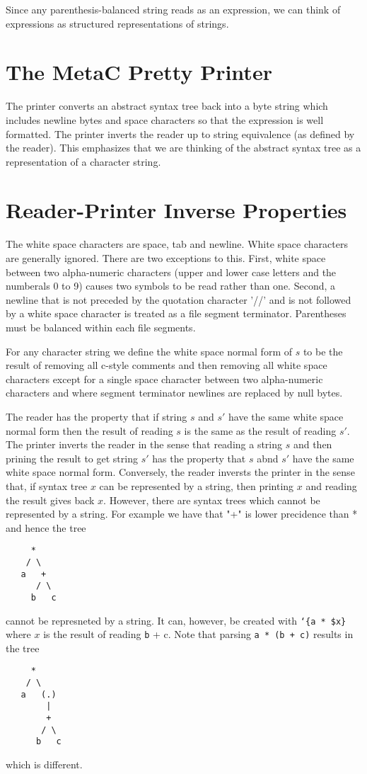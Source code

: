 \documentclass{article}
\newcommand{\mtt}[1]{\mbox{\tt #1}}
\begin{document}
Since any parenthesis-balanced string reads as an expression, we can think of expressions as structured representations of strings.



\section{The MetaC Pretty Printer}

The printer converts an abstract syntax tree back into a byte string which includes newline bytes and space characters
so that the expression is well formatted. The printer inverts the reader up to string equivalence (as defined by the reader).
This emphasizes that we are thinking of the abstract syntax tree as a representation of a character string.

\section{Reader-Printer Inverse Properties}

The white space characters are space, tab and newline.  White space characters are generally ignored.  There are two exceptions to this.
First, white space between two alpha-numeric characters (upper and lower case letters and the numberals 0 to 9) causes two symbols to be read rather than one.
Second, a newline that is not preceded by the quotation character '//' and is not followed by a white space character is
treated as a file segment terminator.  Parentheses must be balanced within each file segments.

For any character string we define the white space normal form of $s$
to be the result of removing all c-style comments and then removing all white space characters except for
a single space character between two alpha-numeric characters and where segment terminator newlines
are replaced by null bytes.

The reader has the property that if string $s$ and $s'$ have the same white space normal form then the result of reading
$s$ is the same as the result of reading $s'$.  The printer inverts the reader
in the sense that reading a string $s$ and then prining the result to get string $s'$ has the property that $s$ abnd $s'$ have the same white space normal form.
Conversely, the reader inversts the printer in the sense that, if syntax tree $x$ can be represented by a string, then printing $x$ and reading the result gives back $x$.
However, there are syntax trees which cannot be represented by a string.  For example we have that "+" is lower precidence than * and hence the tree
\begin{verbatim}
     *
    / \
   a   +
      / \
     b   c
\end{verbatim}
cannot be represneted by a string. It can, however, be created with {\tt `\{a * \$x\}} where $x$ is the result of reading {\mtt b + c}.
Note that parsing {\tt a * (b + c)} results in the tree
\begin{verbatim}
     *
    / \
   a   (.)
        |
        +
       / \
      b   c
\end{verbatim}
which is different.
\end{document}
